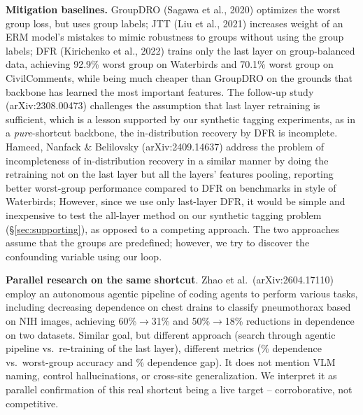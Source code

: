 \documentclass{ieeeaccess}
\newcommand{\arw}{$\rightarrow$}
\begin{document}
\textbf{Mitigation baselines.} GroupDRO (Sagawa et al., 2020) \cite{sagawa2020groupdro} optimizes the worst group loss, but uses group labels; JTT (Liu et al., 2021) \cite{liu2021jtt} increases weight of an ERM model's mistakes to mimic robustness to groups without using the group labels; DFR (Kirichenko et al., 2022) \cite{kirichenko2022dfr} trains only the last layer on group-balanced data, achieving 92.9\% worst group on Waterbirds and 70.1\% worst group on CivilComments, while being much cheaper than GroupDRO on the grounds that backbone has learned the most important features. The follow-up study (arXiv:2308.00473) \cite{dfr_followup} challenges the assumption that last layer retraining is sufficient, which is a lesson supported by our synthetic tagging experiments, as in a \emph{pure}-shortcut backbone, the in-distribution recovery by DFR is incomplete. Hameed, Nanfack \& Belilovsky (arXiv:2409.14637) \cite{dfr_multilayer} address the problem of incompleteness of in-distribution recovery in a similar manner by doing the retraining not on the last layer but all the layers' features pooling, reporting better worst-group performance compared to DFR on benchmarks in style of Waterbirds; However, since we use only last-layer DFR, it would be simple and inexpensive to test the all-layer method on our synthetic tagging problem (\S\ref{sec:supporting}), as opposed to a competing approach. The two approaches assume that the groups are predefined; however, we try to discover the confounding variable using our loop.

\textbf{Parallel research on the same shortcut}. Zhao et al.\ (arXiv:2604.17110) \cite{zhao2026} employ an autonomous agentic pipeline of coding agents to perform various tasks, including decreasing dependence on chest drains to classify pneumothorax based on NIH images, achieving 60\%\arw{}31\% and 50\%\arw{}18\% reductions in dependence on two datasets. Similar goal, but different approach (search through agentic pipeline vs.\ re-training of the last layer), different metrics (\% dependence vs.\ worst-group accuracy and \% dependence gap). It does not mention VLM naming, control hallucinations, or cross-site generalization. We interpret it as parallel confirmation of this real shortcut being a live target -- corroborative, not competitive.
\end{document}
